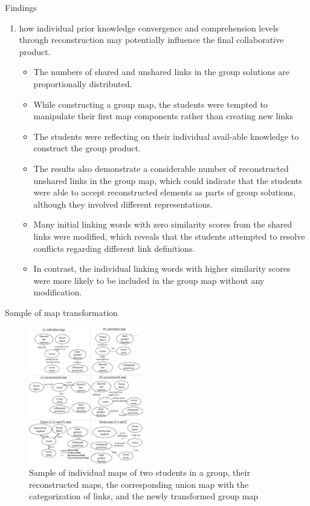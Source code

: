 \begin{frame}[allowframebreaks]{Findings}
\begin{enumerate}
    \item how individual prior knowledge convergence and comprehension 
          levels through reconstruction may potentially influence the final collaborative product.
          \begin{itemize}
            \item The numbers of shared and unshared links in the group solutions are proportionally distributed.
            \item While constructing a group map, the students were tempted to manipulate their first map components rather than creating new links
            \item The students were reflecting on their individual avail-able knowledge to construct the group product.
            \item The results also demonstrate a considerable number of reconstructed unshared links in the group map, which could indicate that the students were able to accept reconstructed elements as parts of group solutions, although they involved different representations. 
            \item Many initial linking words with zero similarity scores from the shared links were modified, which reveals that the students attempted to resolve conflicts regarding different link definitions.  
            \item In contrast, the individual linking words with higher similarity scores were more likely to be included in the group map without any modification.
          \end{itemize}
\end{enumerate}
    
\end{frame}

\begin{frame}{Sample of map transformation}
    \begin{figure}[tb]
        \begin{center}
            \includegraphics[width=50mm]{images/a3_sample_of_map.pdf}
        \end{center}
        \caption{Sample of individual maps of two students in a group, their reconstructed maps,
            the corresponding union map with the categorization of links, and the 
            newly transformed group map}
        \label{map_sample}
    \end{figure} 
\end{frame}


